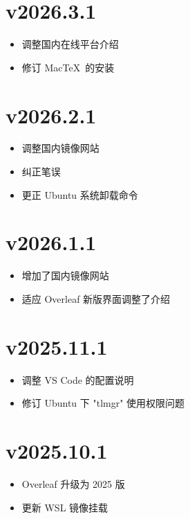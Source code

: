 \section*{v2026.3.1}

\begin{itemize}
  \item 调整国内在线平台介绍
  \item 修订 Mac\TeX\ 的安装
\end{itemize}

\section*{v2026.2.1}

\begin{itemize}
  \item 调整国内镜像网站
  \item 纠正笔误
  \item 更正 Ubuntu 系统卸载命令
\end{itemize}

\section*{v2026.1.1}

\begin{itemize}
  \item 增加了国内镜像网站
  \item 适应 Overleaf 新版界面调整了介绍
\end{itemize}

\section*{v2025.11.1}

\begin{itemize}
  \item 调整 VS Code 的配置说明
  \item 修订 Ubuntu 下 "tlmgr" 使用权限问题
\end{itemize}

\section*{v2025.10.1}

\begin{itemize}
  \item Overleaf 升级为 2025 版
  \item 更新 WSL 镜像挂载
\end{itemize}

